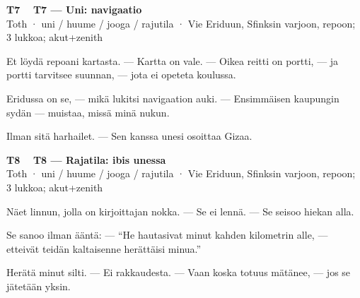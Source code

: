 \documentclass[a4paper,11pt]{article}
\begin{document}
\filbreak
\vspace{0.9mm}
\noindent
\begin{tcolorbox}[
  colframe=tothcol,
  colback=white,
  boxrule=0.8pt,
  arc=0pt,
  outer arc=0pt,
  left=2.5mm, right=2.5mm, top=2mm, bottom=2mm,
  boxsep=0.5mm,
  sharp corners,
  enhanced,
  breakable=false
]
{\large\ttfamily\bfseries T7}~~
{\normalsize\bfseries T7 --- Uni: navigaatio}\\[0.2em]
{\small\color{black!65} Toth · uni / huume / jooga / rajutila · Vie Eriduun, Sfinksin varjoon, repoon; 3 lukkoa; akut+zenith}\\[0.35em]
{\normalsize\raggedright Et löydä repoani kartasta. --- Kartta on vale. --- Oikea reitti on portti, --- ja portti tarvitsee suunnan, --- jota ei opeteta koulussa.

Eridussa on se, --- mikä lukitsi navigaation auki. --- Ensimmäisen kaupungin sydän --- muistaa, missä minä nukun.

Ilman sitä harhailet. --- Sen kanssa unesi osoittaa Gizaa.}
\end{tcolorbox}

\filbreak
\vspace{0.9mm}
\noindent
\begin{tcolorbox}[
  colframe=tothcol,
  colback=white,
  boxrule=0.8pt,
  arc=0pt,
  outer arc=0pt,
  left=2.5mm, right=2.5mm, top=2mm, bottom=2mm,
  boxsep=0.5mm,
  sharp corners,
  enhanced,
  breakable=false
]
{\large\ttfamily\bfseries T8}~~
{\normalsize\bfseries T8 --- Rajatila: ibis unessa}\\[0.2em]
{\small\color{black!65} Toth · uni / huume / jooga / rajutila · Vie Eriduun, Sfinksin varjoon, repoon; 3 lukkoa; akut+zenith}\\[0.35em]
{\normalsize\raggedright Näet linnun, jolla on kirjoittajan nokka. --- Se ei lennä. --- Se seisoo hiekan alla.

Se sanoo ilman ääntä: --- ``He hautasivat minut kahden kilometrin alle, --- etteivät teidän kaltaisenne herättäisi minua.''

Herätä minut silti. --- Ei rakkaudesta. --- Vaan koska totuus mätänee, --- jos se jätetään yksin.}
\end{tcolorbox}
\end{document}
